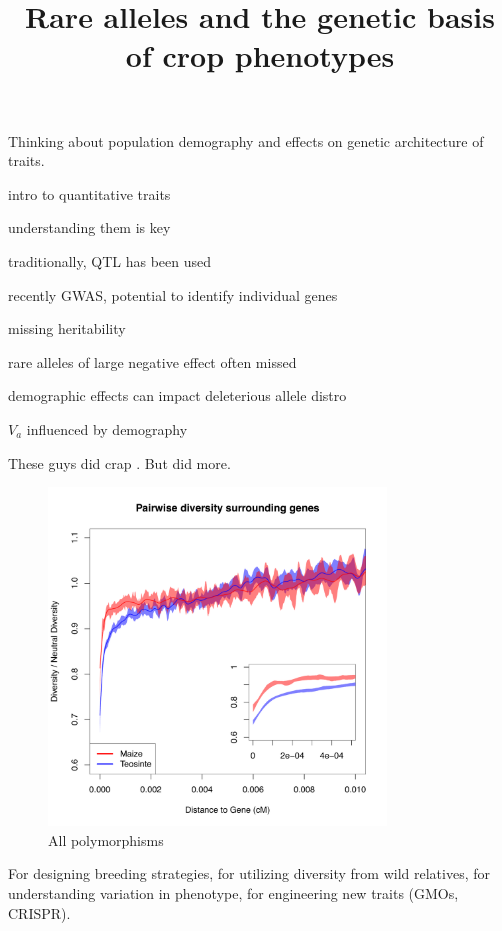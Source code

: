 \documentclass[12pt]{article}
\begin{document}
\title{Rare alleles and the genetic basis of crop phenotypes}
\date{}
\maketitle

Thinking about population demography and effects on genetic architecture of traits.

intro to quantitative traits

 understanding them is key

 traditionally, QTL has been used

 recently GWAS, potential to identify individual genes

 missing heritability

rare alleles of large negative effect often missed \citep{Thornton2013}


demographic effects can impact deleterious allele distro

$V_a$ influenced by demography \citep{Lohmueller2014}


These guys did crap \citep{Gazave2013}.
But \citet{Thornton2014} did more.


\begin{figure}
\centering
   \includegraphics[width=0.8\textwidth]{pairwise.pdf}
  \caption{All polymorphisms}
  \label{fig:sub1}
\end{figure}%




For designing breeding strategies, for utilizing diversity from wild relatives, for understanding variation in phenotype, for engineering new traits (GMOs, CRISPR).





\end{document}
